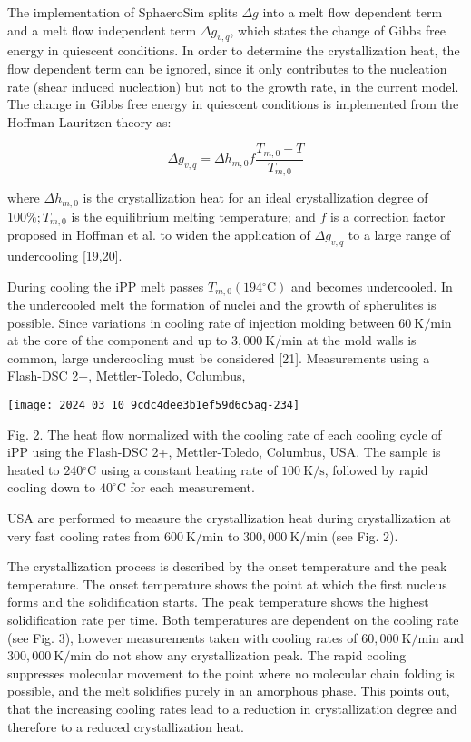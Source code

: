 \documentclass[10pt]{article}
\begin{document}
The implementation of SphaeroSim splits $\Delta g$ into a melt flow dependent term and a melt flow independent term $\Delta g_{v, q}$, which states the change of Gibbs free energy in quiescent conditions. In order to determine the crystallization heat, the flow dependent term can be ignored, since it only contributes to the nucleation rate (shear induced nucleation) but not to the growth rate, in the current model. The change in Gibbs free energy in quiescent conditions is implemented from the Hoffman-Lauritzen theory as:


\begin{equation*}
\Delta g_{v, q}=\Delta h_{m, 0} f \frac{T_{m, 0}-T}{T_{m, 0}} \tag{7}
\end{equation*}


where $\Delta h_{m, 0}$ is the crystallization heat for an ideal crystallization degree of $100 \% ; T_{m, 0}$ is the equilibrium melting temperature; and $f$ is a correction factor proposed in Hoffman et al. to widen the application of $\Delta g_{v, q}$ to a large range of undercooling [19,20].

During cooling the iPP melt passes $T_{m, 0}\left(194{ }^{\circ} \mathrm{C}\right)$ and becomes undercooled. In the undercooled melt the formation of nuclei and the growth of spherulites is possible. Since variations in cooling rate of injection molding between $60 \mathrm{~K} / \mathrm{min}$ at the core of the component and up to $3,000 \mathrm{~K} / \mathrm{min}$ at the mold walls is common, large undercooling must be considered [21]. Measurements using a Flash-DSC 2+, Mettler-Toledo, Columbus,

\begin{center}
\texttt{[image: 2024\_03\_10\_9cdc4dee3b1ef59d6c5ag-234]}
\end{center}

Fig. 2. The heat flow normalized with the cooling rate of each cooling cycle of iPP using the Flash-DSC 2+, Mettler-Toledo, Columbus, USA. The sample is heated to $240{ }^{\circ} \mathrm{C}$ using a constant heating rate of $100 \mathrm{~K} / \mathrm{s}$, followed by rapid cooling down to $40^{\circ} \mathrm{C}$ for each measurement.

USA are performed to measure the crystallization heat during crystallization at very fast cooling rates from $600 \mathrm{~K} / \mathrm{min}$ to $300,000 \mathrm{~K} / \mathrm{min}$ (see Fig. 2).

The crystallization process is described by the onset temperature and the peak temperature. The onset temperature shows the point at which the first nucleus forms and the solidification starts. The peak temperature shows the highest solidification rate per time. Both temperatures are dependent on the cooling rate (see Fig. 3), however measurements taken with cooling rates of $60,000 \mathrm{~K} / \mathrm{min}$ and $300,000 \mathrm{~K} / \mathrm{min}$ do not show any crystallization peak. The rapid cooling suppresses molecular movement to the point where no molecular chain folding is possible, and the melt solidifies purely in an amorphous phase. This points out, that the increasing cooling rates lead to a reduction in crystallization degree and therefore to a reduced crystallization heat.
\end{document}
